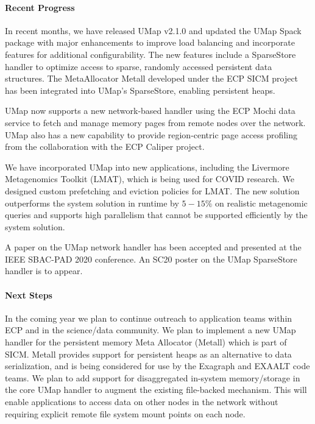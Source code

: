\paragraph{Recent Progress}

In recent months, we have released UMap v2.1.0 and updated the UMap Spack package with major enhancements to improve load balancing and incorporate features for additional configurability. The new features include a SparseStore handler to optimize access to sparse, randomly accessed persistent data structures. The MetaAllocator Metall developed under the ECP SICM project has been integrated into UMap's SparseStore, enabling persistent heaps. 

UMap now supports a new network-based handler using the ECP Mochi data service to fetch and manage memory pages from remote nodes over the network. UMap also has a new capability to provide region-centric page access profiling from the collaboration with the ECP Caliper project. 

We have incorporated UMap into new applications, including the Livermore Metagenomics Toolkit (LMAT), which is being used for COVID research. We designed custom prefetching and eviction policies for LMAT.  The new solution outperforms the system solution in runtime by $5-15\%$ on realistic metagenomic queries and supports high parallelism that cannot be supported efficiently by the system solution. 

A paper on the UMap network handler has been accepted and presented at the IEEE SBAC-PAD 2020 conference. An SC20 poster on the UMap SparseStore handler is to appear.

\paragraph{Next Steps}
In the coming year we plan to continue outreach to application teams
within ECP and in the science/data community. We plan to implement a
new UMap handler for the persistent memory Meta Allocator (Metall)
which is part of SICM. Metall provides support for persistent heaps as
an alternative to data serialization, and is being considered for use by the
Exagraph and EXAALT code teams. We plan to add support for
disaggregated in-system memory/storage in the core UMap handler to
augment the existing file-backed mechanism. This will enable
applications to access data on other nodes in the network without
requiring explicit remote file system mount points on each node.
